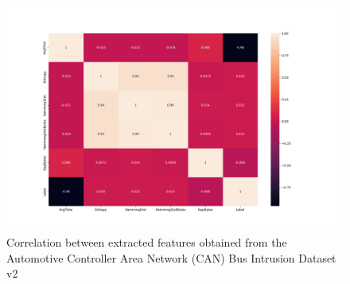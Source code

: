 \begin{figure}
    \centering
    \includegraphics[width = .6\linewidth]{img/parts/app/feature_correlation/OpelAstra/replay.png}
    \caption{Correlation between extracted features obtained from the Automotive Controller Area Network (CAN) Bus Intrusion Dataset v2}
    \label{fig:apdx_fe_tue_opelastra}
\end{figure}